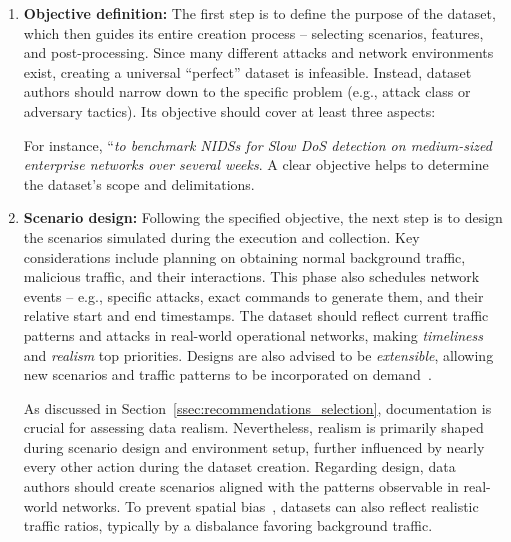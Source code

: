 \begin{enumerate}[nosep, label=\textbf{\arabic*}., topsep=0pt, wide, labelindent=\parindent, itemsep=0pt, parsep=0pt]
\setcounter{enumi}{0}

\item \textbf{Objective definition:} The first step is to define the purpose of the dataset, which then guides its entire creation process -- selecting scenarios, features, and post-processing. Since many different attacks and network environments exist, creating a universal ``perfect'' dataset is infeasible. Instead, dataset authors should narrow down to the specific problem (e.g., attack class or adversary tactics). Its objective should cover at least three aspects:
For instance, ``\emph{to benchmark NIDSs for Slow DoS detection on medium-sized enterprise networks over several weeks}. A clear objective helps to determine the dataset's scope and delimitations.

\item \textbf{Scenario design:} Following the specified objective, the next step is to design the scenarios simulated during the execution and collection. Key considerations include planning on obtaining normal background traffic, malicious traffic, and their interactions. This phase also schedules network events -- e.g., specific attacks, exact commands to generate them, and their relative start and end timestamps. The dataset should reflect current traffic patterns and attacks in real-world operational networks, making \emph{timeliness} and \emph{realism} top priorities. Designs are also advised to be \emph{extensible}, allowing new scenarios and traffic patterns to be incorporated on demand~\cite{viegas2017_trabid_dataset,apruzzese2022_sok_unlabeled_data}.

As discussed in Section~\ref{ssec:recommendations_selection}, documentation is crucial for assessing data realism. Nevertheless, realism is primarily shaped during scenario design and environment setup, further influenced by nearly every other action during the dataset creation. Regarding design, data authors should create scenarios aligned with the patterns observable in real-world networks. To prevent spatial bias~\cite{pendlebury2019_tesseract}, datasets can also reflect realistic traffic ratios, typically by a disbalance favoring background traffic.


\end{enumerate}
